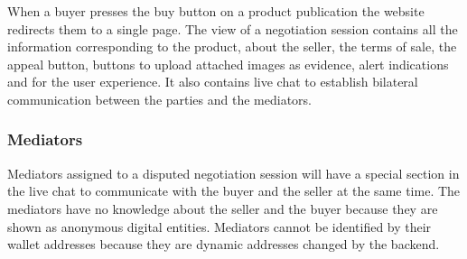 \documentclass[12pt]{article}
\begin{document}
When a buyer presses the buy button on a product publication the website redirects them to a single page. The view of a negotiation session contains all the information corresponding to the product, about the seller, the terms of sale, the appeal button, buttons to upload attached images as evidence, alert indications and for the user experience. It also contains live chat to establish bilateral communication between the parties and the mediators.

\subsubsection { Mediators } 

Mediators assigned to a disputed negotiation session will have a special section in the live chat to communicate with the buyer and the seller at the same time. The mediators have no knowledge about the seller and the buyer because they are shown as anonymous digital entities. Mediators cannot be identified by their wallet addresses because they are dynamic addresses changed by the backend.
\end{document}
